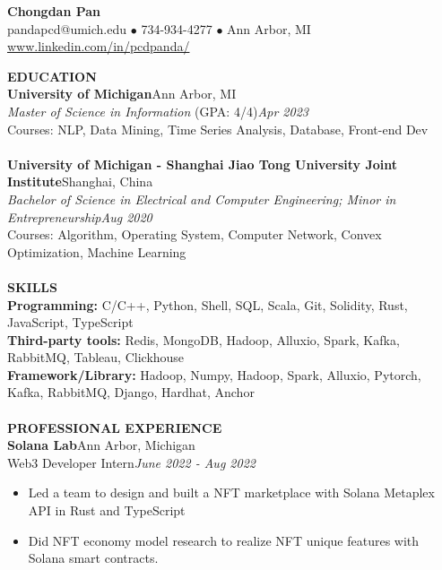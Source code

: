 \documentclass[10pt,a4paper]{article}
\begin{document}
\begin{center}
    \Large{\textbf{Chongdan Pan}}\\
    \normalsize{pandapcd@umich.edu $\bullet$ 734-934-4277 $\bullet$ Ann Arbor, MI}\\
    \normalsize{\href{https://www.linkedin.com/in/pandapcd/}{www.linkedin.com/in/pcdpanda/}}
\end{center}
\noindent
\rlap{\rule[-1mm]{\linewidth}{.5mm}}\textbf{\large{EDUCATION}}\\
\noindent\textbf{University of Michigan}\hfill Ann Arbor, MI\\
\emph{Master of Science in Information} (GPA: 4/4)\hfill\emph{Apr 2023}\\
Courses: NLP, Data Mining, Time Series Analysis, Database, Front-end Dev\\\\
\textbf{University of Michigan - Shanghai Jiao Tong University Joint Institute}\hfill Shanghai, China\\
\emph{Bachelor of Science in Electrical and Computer Engineering; Minor in Entrepreneurship}\hfill\emph{Aug 2020}\\
Courses: Algorithm, Operating System, Computer Network, Convex Optimization, Machine Learning\\\\
\noindent
\rlap{\rule[-1mm]{\linewidth}{.5mm}}\textbf{\large{SKILLS}}\\
\textbf{Programming: }C/C++, Python, Shell, SQL, Scala, Git, Solidity, Rust, JavaScript, TypeScript\\
\textbf{Third-party tools: }Redis, MongoDB, Hadoop, Alluxio, Spark, Kafka, RabbitMQ, Tableau, Clickhouse\\
\textbf{Framework/Library: }Hadoop, Numpy, Hadoop, Spark, Alluxio, Pytorch, Kafka, RabbitMQ, Django, Hardhat, Anchor\\\\
\noindent
\rlap{\rule[-1mm]{\linewidth}{.5mm}}\textbf{\large{PROFESSIONAL EXPERIENCE}}\\
\textbf{Solana Lab}\hfill Ann Arbor, Michigan\\
Web3 Developer Intern\hfill\emph{June 2022 - Aug 2022}
\begin{itemize}[noitemsep,topsep=0pt]
    \item Led a team to design and built a NFT marketplace with Solana Metaplex API in Rust and TypeScript
    \item Did NFT economy model research to realize NFT unique features with Solana smart contracts.
\end{itemize}
\end{document}
